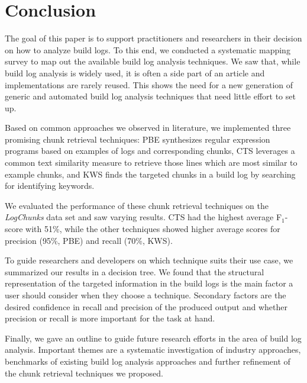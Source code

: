 \section{Conclusion}
\label{sec:conclusion-fw}

The goal of this paper is to support practitioners and researchers in
their decision on how to analyze build logs.
To this end, we
conducted a systematic mapping survey to map out the available build
log analysis techniques.
We saw that, while build log analysis is widely used, it is often
a side part of an article and implementations are rarely reused.
This shows the need for a new generation of generic and automated
build log analysis techniques that need little effort to set up.

Based on common approaches we observed in literature,
we implemented three promising chunk retrieval techniques:
PBE synthesizes regular expression programs based on examples of logs
and corresponding chunks, CTS leverages a common text similarity
measure to retrieve those lines which are most similar to example
chunks, and KWS finds the targeted chunks in a build log by searching
for identifying keywords.

We evaluated the performance of these chunk retrieval techniques on the
\emph{LogChunks} data set and saw varying results.
CTS had the highest average F$_{1}$-score with 51\%, while the other
techniques showed higher average scores for precision (95\%, PBE)
and recall (70\%, KWS).

To guide researchers and developers on which technique suits their
use case,
we summarized our results in a decision tree.
We found
that the structural representation of the targeted information in the
build logs is the main factor a user should consider when they
choose a
technique.
Secondary factors are the desired confidence in recall and
precision of the produced output and whether precision or recall is
more important for the task at hand.

Finally, we gave an
outline to guide future research efforts in the area of build log
analysis.
Important themes are a systematic investigation of industry approaches,
benchmarks of existing build log analysis approaches and further
refinement of the chunk retrieval techniques we proposed.

